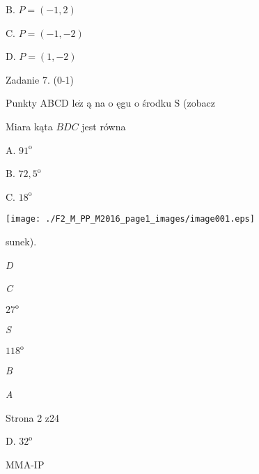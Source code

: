 \documentclass[a4paper,12pt]{article}
\begin{document}
B. $P=(-1,2)$

C. $P=(-1,-2)$

D. $P=(1,-2)$

Zadanie 7. (0-1)

Punkty ABCD $\mathrm{l}\mathrm{e}\dot{\mathrm{z}}$ ą na o ęgu o środku $\mathrm{S}$ (zobacz

Miara kąta $BDC$ jest równa

A. $91^{\mathrm{o}}$

B. $72,5^{\mathrm{o}}$

C. $18^{\mathrm{o}}$
\begin{center}
\texttt{[image: ./F2\_M\_PP\_M2016\_page1\_images/image001.eps]}
\end{center}
sunek).

{\it D}

{\it C}

$27^{\mathrm{o}}$

{\it S}

$118^{\mathrm{o}}$

{\it B}

{\it A}

Strona 2 z24

D. $32^{\mathrm{o}}$

MMA-IP
\end{document}
